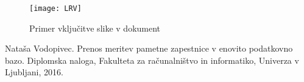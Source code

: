 \documentclass[11pt,a4paper]{article}
\begin{document}
\begin{figure}[htb]
\begin{center}
\texttt{[image: LRV]}
\end{center}
\caption{Primer vključitve slike v dokument}
\label{fig:test}
\end{figure}


\begin{thebibliography}{9}

Nataša Vodopivec.
Prenos meritev pametne zapestnice v enovito podatkovno bazo.
Diplomska naloga, Fakulteta za računalništvo in informatiko, Univerza v Ljubljani, 2016.

\end{thebibliography}
\end{document}
